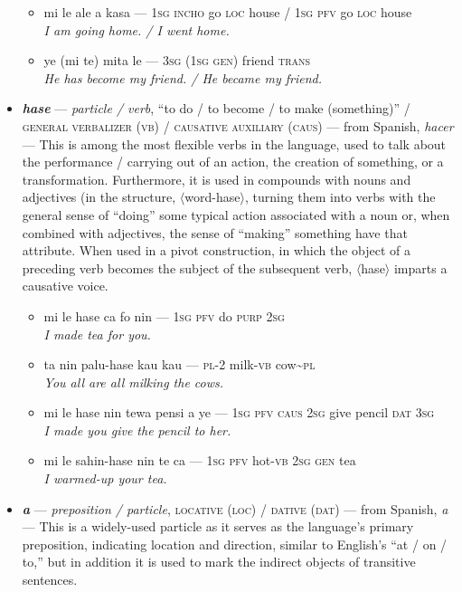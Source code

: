 \documentclass[a4paper]{article}
\begin{document}
\begin{itemize}
\begin{itemize}
		\item mi le ale a kasa — \textsc{1sg incho} go \textsc{loc} house /  \textsc{1sg pfv} go \textsc{loc} house  \\\textit{I am going home. / I went home.}
		\item ye (mi te) mita le — \textsc{3sg (1sg gen)} friend \textsc{trans} \\\textit{He has become my friend. / He became my friend.}
	\end{itemize}
	\item \textbf{\textit{hase}} — \textit{particle / verb}, ``to do / to become / to make (something)'' / \textsc{general verbalizer (vb) / causative auxiliary (caus)} — from Spanish, \textit{hacer} — This is among the most flexible verbs in the language, used to talk about the performance / carrying out of an action, the creation of something, or a transformation. Furthermore, it is used in compounds with nouns and adjectives (in the structure, $\langle$word-hase$\rangle$, turning them into verbs with the general sense of ``doing'' some typical action associated with a noun or, when combined with adjectives, the sense of ``making'' something have that attribute. When used in a pivot construction, in which the object of a preceding verb becomes the subject of the subsequent verb, $\langle$hase$\rangle$ imparts a causative voice.
	\begin{itemize}
		\item mi le hase ca fo nin — \textsc{1sg pfv} do \textsc{purp 2sg} \\\textit{I made tea for you.}
		\item ta nin palu-hase kau kau  — \textsc{pl-2} milk-\textsc{vb} cow\textasciitilde{}\textsc{pl} \\\textit{You all are all milking the cows.}
		\item mi le hase nin tewa pensi a ye — \textsc{1sg pfv caus} \textsc{2sg} give pencil \textsc{dat 3sg} \\\textit{I made you give the pencil to her.}
		\item mi le sahin-hase nin te ca — \textsc{1sg pfv} hot-\textsc{vb} \textsc{2sg gen} tea \\\textit{I warmed-up your tea.}
	\end{itemize}
	\item \textbf{\textit{a}} — \textit{preposition / particle}, \textsc{locative (loc) / dative (dat)} — from Spanish, \textit{a} — This is a widely-used particle as it serves as the language's primary preposition, indicating location and direction, similar to English's ``at / on / to,'' but in addition it is used to mark the indirect objects of transitive sentences.

\end{itemize}
\end{document}
